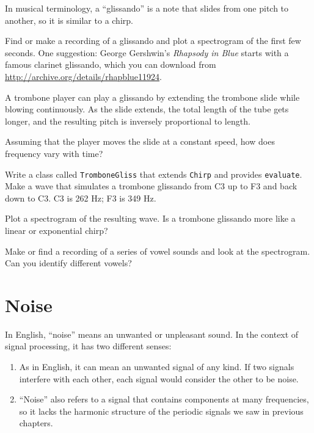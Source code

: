\documentclass[12pt]{book} \usepackage[width=5.5in,height=8.5in, hmarginratio=3:2,vmarginratio=1:1]{geometry}
\begin{document}
\begin{exercise} In musical terminology, a ``glissando'' is a note that slides from one pitch to another, so it is similar to a chirp. 

Find or make a recording of a glissando and plot a spectrogram of the first few seconds. One suggestion: George Gershwin's {\it Rhapsody in Blue} starts with a famous clarinet glissando, which you can download from \url{http://archive.org/details/rhapblue11924}. \end{exercise} 

\begin{exercise} A trombone player can play a glissando by extending the trombone slide while blowing continuously. As the slide extends, the total length of the tube gets longer, and the resulting pitch is inversely proportional to length. 

Assuming that the player moves the slide at a constant speed, how does frequency vary with time? 

Write a class called {\tt TromboneGliss} that extends {\tt Chirp} and provides {\tt evaluate}. Make a wave that simulates a trombone glissando from C3 up to F3 and back down to C3. C3 is 262 Hz; F3 is 349 Hz. 

Plot a spectrogram of the resulting wave. Is a trombone glissando more like a linear or exponential chirp? \end{exercise} 

\begin{exercise} Make or find a recording of a series of vowel sounds and look at the spectrogram. Can you identify different vowels? \end{exercise} 

\chapter{Noise} 

In English, ``noise'' means an unwanted or unpleasant sound. In the context of signal processing, it has two different senses: 

\begin{enumerate} 

\item As in English, it can mean an unwanted signal of any kind. If two signals interfere with each other, each signal would consider the other to be noise. 

\item ``Noise'' also refers to a signal that contains components at many frequencies, so it lacks the harmonic structure of the periodic signals we saw in previous chapters. 

\end{enumerate} 
\end{document}
